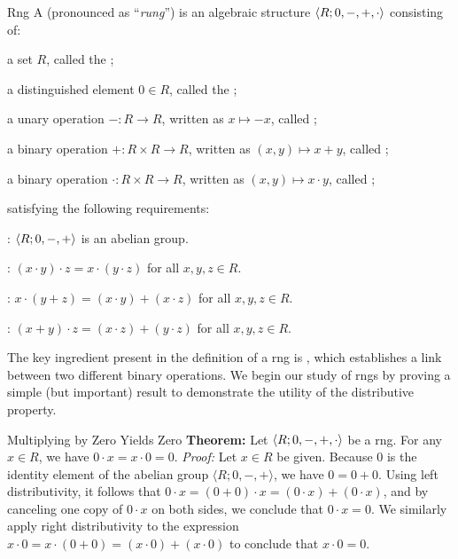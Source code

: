 \documentclass[12pt]{report}
\begin{document}
\begin{dfnbox}{Rng}
	A  (pronounced as ``\textit{rung}'') is an algebraic structure ${\langle {R; 0, -, +, \cdot} \rangle}$ consisting of:
	\begin{dfnitems}
		\item a set $R$, called the ;
		\item a distinguished element $0 \in R$, called the ;
		\item a unary operation $-: R \to R$, written as $x \mapsto -x$, called ;
		\item a binary operation $+: R \times R \to R$, written as $(x, y) \mapsto x + y$, called ;
		\item a binary operation $\cdot: R \times R \to R$, written as $(x, y) \mapsto x \cdot y$, called ;
	\end{dfnitems}
	satisfying the following requirements:
	\begin{dfnitems}
		\item {}: ${\langle {R; 0, -, +} \rangle}$ is an abelian group.
		\item {}: $(x \cdot y) \cdot z = x \cdot (y \cdot z)$ for all $x, y, z \in R$.
		\item {}: $x \cdot (y + z) = (x \cdot y) + (x \cdot z)$ for all $x, y, z \in R$.
		\item {}: $(x + y) \cdot z = (x \cdot z) + (y \cdot z)$ for all $x, y, z \in R$.
	\end{dfnitems}
\end{dfnbox}

The key ingredient present in the definition of a rng is , which establishes a link between two different binary operations. We begin our study of rngs by proving a simple (but important) result to demonstrate the utility of the distributive property.

\begin{thmbox}{Multiplying by Zero Yields Zero}
	\textbf{Theorem:} Let ${\langle {R; 0, -, +, \cdot} \rangle}$ be a rng. For any $x \in R$, we have $0 \cdot x = x \cdot 0 = 0$.
\tcblower
	\textit{Proof:} Let $x \in R$ be given. Because $0$ is the identity element of the abelian group $\langle R; 0, -, + \rangle$, we have $0 = 0 + 0$. Using left distributivity, it follows that $0 \cdot x = (0 + 0) \cdot x = (0 \cdot x) + (0 \cdot x)$, and by canceling one copy of $0 \cdot x$ on both sides, we conclude that $0 \cdot x = 0$. We similarly apply right distributivity to the expression $x \cdot 0 = x \cdot (0 + 0) = (x \cdot 0) + (x \cdot 0)$ to conclude that $x \cdot 0 = 0$.
\end{thmbox}
\end{document}
